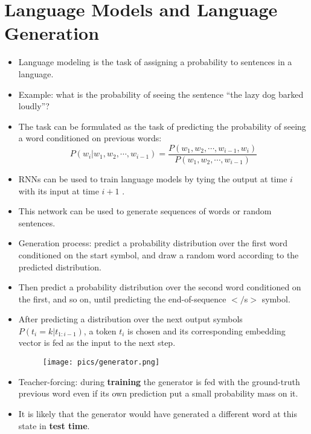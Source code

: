 \section{Language Models and Language Generation}
\begin{itemize}
\item Language modeling is the task of assigning a probability to sentences in a language.
\item Example: what is the probability of seeing the sentence ``the lazy dog barked loudly''?
\item The task can be formulated as the task of predicting the probability of seeing a word conditioned on previous words:
\begin{displaymath}
 P(w_i | w_1, w_2, \cdots, w_{i-1}) = \frac{P(w_1, w_2, \cdots, w_{i-1}, w_i)}{P(w_1, w_2, \cdots, w_{i-1})}  
\end{displaymath}
\item  RNNs can be used to train language models by tying the output at time $i$ with its input at time $i + 1$ .
\item This network can be used to generate sequences of words or random sentences.
\item Generation process: predict a probability distribution over the first word conditioned on the start symbol, and draw a random word according to the predicted
distribution.

\item Then predict a probability distribution over the second word conditioned on the first, and so on, until predicting the end-of-sequence $</$s$>$ symbol.
\item After predicting a distribution over the next output symbols $P(t_i = k | t_{1:i-1})$, a token $t_i$ is chosen and its corresponding embedding vector is fed as the input to the next step.
         \begin{figure}[h]
        	\texttt{[image: pics/generator.png]}
        \end{figure}  
        
\item Teacher-forcing: during \textbf{training} the generator is fed with the ground-truth previous word even if its own prediction put a small probability mass on it. 
\item It is likely that the generator would have generated a different word at this state in \textbf{test time}.        
\end{itemize}
        
